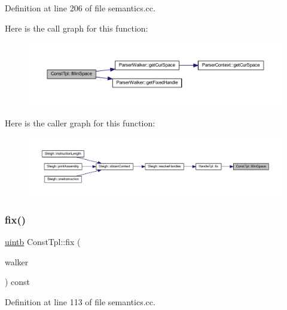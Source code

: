 Definition at line 206 of file semantics.\+cc.

Here is the call graph for this function\+:
\nopagebreak
\begin{figure}[H]
\begin{center}
\leavevmode
\includegraphics[width=350pt]{class_const_tpl_ad04e4bde130998d2083f9befd8472d66_cgraph}
\end{center}
\end{figure}
Here is the caller graph for this function\+:
\nopagebreak
\begin{figure}[H]
\begin{center}
\leavevmode
\includegraphics[width=350pt]{class_const_tpl_ad04e4bde130998d2083f9befd8472d66_icgraph}
\end{center}
\end{figure}
\mbox{\label{class_const_tpl_a2676416d2a1e9a14443ca54fb8af042d}} 
\subsubsection{\texorpdfstring{fix()}{fix()}}
{\footnotesize\ttfamily \mbox{\hyperlink{types_8h_a2db313c5d32a12b01d26ac9b3bca178f}{uintb}} Const\+Tpl\+::fix (\begin{DoxyParamCaption}\item[{const \mbox{\hyperlink{class_parser_walker}{Parser\+Walker}} \&}]{walker }\end{DoxyParamCaption}) const}



Definition at line 113 of file semantics.\+cc.

